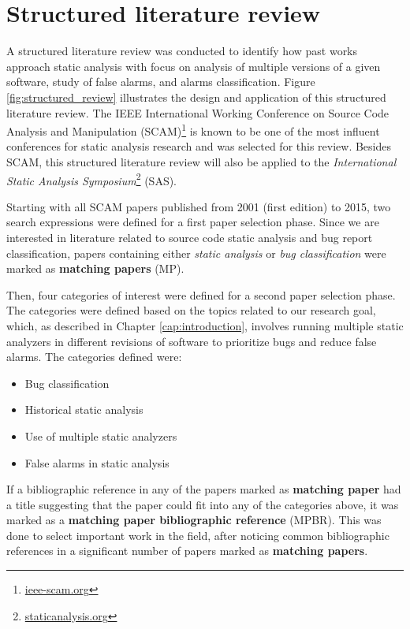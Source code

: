 \chapter{Structured literature review}
\label{cap:structured_review}

A structured literature review was conducted to identify how past works
approach static analysis with focus on analysis of multiple versions of a given
software, study of false alarms, and alarms classification. Figure
\ref{fig:structured_review} illustrates the design and application of this
structured literature review. The IEEE International Working Conference on Source Code
Analysis and Manipulation (SCAM)\footnote{\url{ieee-scam.org}} is known to be
one of the most influent conferences for static analysis research and was
selected for this review.  Besides SCAM, this structured literature review will also be
applied to the \textit{International Static Analysis
Symposium}\footnote{\url{staticanalysis.org}} (SAS).



Starting with all SCAM papers published from 2001 (first edition) to 2015, two
search expressions were defined for a first paper selection phase. Since we are interested
in literature related to source code static analysis and  bug report
classification, papers containing either \textit{static analysis} or
\textit{bug classification} were marked as \textbf{matching papers} (MP).

Then, four categories of interest were defined for a second paper selection phase. The
categories were defined based on the topics related to our research goal, which,
as described in Chapter \ref{cap:introduction}, involves running multiple static
analyzers in different revisions of software to prioritize bugs and reduce false
alarms. The categories defined were:

\begin{itemize}
\item Bug classification
\item Historical static analysis
\item Use of multiple static analyzers
\item False alarms in static analysis
\end{itemize}

If a bibliographic reference in any of the papers marked as \textbf{matching
paper} had a title suggesting that the paper could fit into any of the
categories above, it was marked as a \textbf{matching paper bibliographic
reference} (MPBR). This was done to select important work in the field,
after noticing common bibliographic references in a significant number of
papers marked as \textbf{matching papers}.

